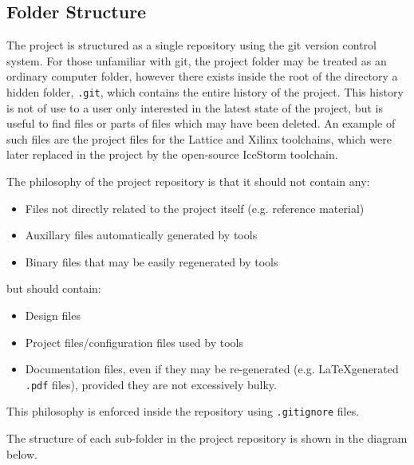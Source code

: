 \clearpage
\begin{appendices}
	
\chapter{Folder Structure} \label{sec:folder-struct}

The project is structured as a single repository using the git version control system. For those unfamiliar with git, the project folder may be treated as an ordinary computer folder, however there exists inside the root of the directory a hidden folder, \texttt{.git}, which contains the entire history of the project. This history is not of use to a user only interested in the latest state of the project, but is useful to find files or parts of files which may have been deleted. An example of such files are the project files for the Lattice and Xilinx toolchains, which were later replaced in the project by the open-source IceStorm toolchain.

The philosophy of the project repository is that it should not contain any:
\begin{itemize}
	\item Files not directly related to the project itself (e.g. reference material)
	\item Auxillary files automatically generated by tools
	\item Binary files that may be easily regenerated by tools
\end{itemize}
but should contain:
\begin{itemize}
	\item Design files
	\item Project files/configuration files used by tools
	\item Documentation files, even if they may be re-generated (e.g. \LaTeX generated \texttt{.pdf} files), provided they are not excessively bulky.
\end{itemize}
This philosophy is enforced inside the repository using \texttt{.gitignore} files.


The structure of each sub-folder in the project repository is shown in the diagram below.




\end{appendices}
